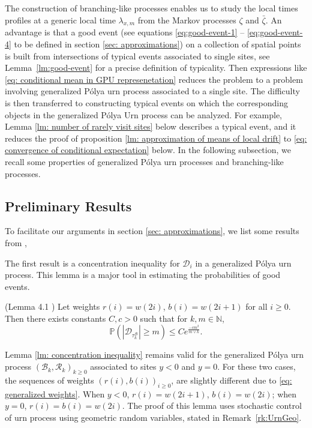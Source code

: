 \documentclass[EJP]{ejpecp} %
\newcommand{\abs}[1]{\left\vert #1 \right\vert}
\begin{document}
The construction of branching-like processes enables us to study the local times profiles at a generic local time $\lambda_{x,m}$ from the Markov processes $\zeta$ and $\bar{\zeta}$. An advantage is that a good event ({see equations \eqref{eq:good-event-1} -- \eqref{eq:good-event-4} to be defined in section \ref{sec: approximations}}) on a collection of spatial points is built from intersections of typical events associated to single sites, see Lemma~\ref{lm:good-event} for a precise definition of typicality. Then expressions like \eqref{eq: conditional mean in GPU represenetation} reduces the problem to a problem involving generalized P\'{o}lya urn process associated to a single site. The difficulty is then transferred to constructing typical events on which the corresponding objects in the generalized P\'olya Urn process can be analyzed. For example, Lemma \ref{lm: number of rarely visit sites} below describes a typical event, and it reduces the proof of proposition \ref{lm: approximation of means of local drift} to \eqref{eq: convergence of conditional expectation} below. In the following subsection, we recall some properties of generalized P\'{o}lya urn processes and branching-like processes.

\subsection{Preliminary Results}
To facilitate our arguments in section \ref{sec: approximations}, we list some results from \cite{KMP23,T96}, 

The first result is a concentration inequality for $\mathscr{D}_i$ in a generalized P\'{o}lya urn process. This lemma is a major tool in estimating the probabilities of good events.
\begin{lemma}(Lemma 4.1 \cite{KMP23})\label{lm: concentration inequality}
	Let weights $r(i) = w(2i)$, $b(i)= w(2i+1) $ for all $i\geq 0$. Then there exists constants $C,c>0$ such that for $k, m \in \mathbb{N}$,
	\[
	\mathbb{P}\left(  \abs{ \mathscr{D}_{\tau_k^{\mathscr{B}}}   } \geq m \right) \leq C e^{\frac{-cm^2}{m \vee k}}.
	\]
\end{lemma} 
Lemma \ref{lm: concentration inequality} remains valid for the generalized P\'{o}lya urn process $(\mathscr{B}_{k},\mathscr{R}_{k})_{k \ge 0}$ associated to sites $y<0$ and $y=0$. For these two cases, the sequences of weights $(r(i),b(i))_{i\ge 0}$, are slightly different due to \eqref{eq: generalized weights}. When $y<0$, $r(i) = w(2i+1)$, $b(i)= w(2i) $; when $y=0$, $r(i) = b(i)=w(2i)$. The proof of this lemma uses stochastic control of urn process using geometric random variables, stated in Remark~\ref{rk:UrnGeo}.
\end{document}
